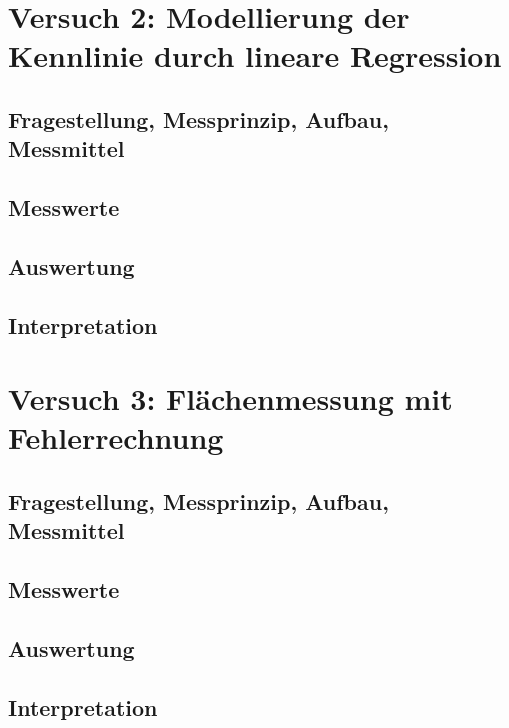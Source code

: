 \documentclass[12pt, oneside, a4paper, \docLanguage]{report}
\begin{document}
%
%
\chapter{Versuch 2: Modellierung der Kennlinie durch lineare Regression}
\label{chap:VERSUCH_2}

\section{Fragestellung, Messprinzip, Aufbau, Messmittel}
\label{chap:VERSUCH_2_FRAGESTELLUNG}

\section{Messwerte}
\label{chap:VERSUCH_2_MESSWERTE}

\section{Auswertung}
\label{chap:VERSUCH_2_AUSWERTUNG}

\section{Interpretation}
\label{chap:VERSUCH_2_INTERPRETATION}

%
%
\chapter{Versuch 3: Flächenmessung mit Fehlerrechnung}
\label{chap:VERSUCH_3}

\section{Fragestellung, Messprinzip, Aufbau, Messmittel}
\label{chap:VERSUCH_3_FRAGESTELLUNG}

\section{Messwerte}
\label{chap:VERSUCH_3_MESSWERTE}

\section{Auswertung}
\label{chap:VERSUCH_3_AUSWERTUNG}

\section{Interpretation}
\label{chap:VERSUCH_3_INTERPRETATION}
\end{document}
